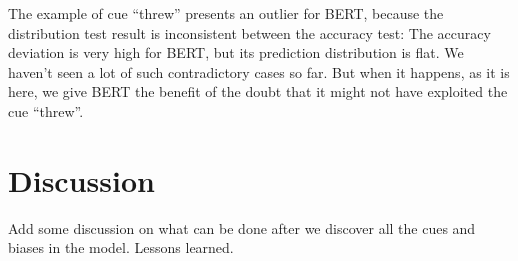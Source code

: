 The example of cue ``threw'' presents an outlier for BERT,
because the distribution test result is inconsistent between the accuracy test: 
The accuracy deviation is very high for BERT, but its prediction distribution is
flat. We haven't seen a lot of such contradictory cases so far. 
But when it happens, as it is here, we give BERT the benefit of the doubt 
that it might not have exploited the cue ``threw''. 


%

\section{Discussion}
Add some discussion on what can be done after we discover all the cues and
biases in the model. Lessons learned.
